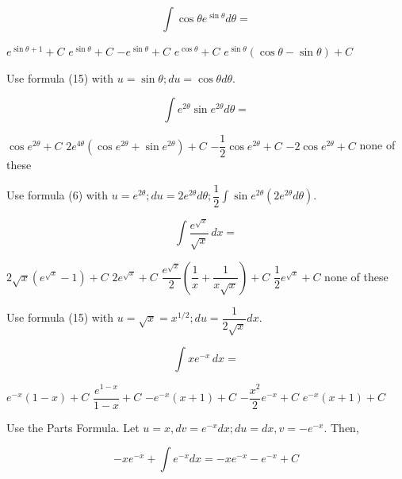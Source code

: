 \newpage


\question
\[
\displaystyle\int \cos \theta e^{\sin \theta} d \theta=
\]
\begin{choices}
  \choice $e^{\sin \theta+1}+C$
  \CorrectChoice $e^{\sin \theta}+C$
  \choice $-e^{\sin \theta}+C$
  \choice $e^{\cos \theta}+C$
  \choice $e^{\sin \theta}(\cos \theta-\sin \theta)+C$
\end{choices}
\begin{solution}
Use formula (15) with $u=\sin \theta ; d u=\cos \theta d \theta$.
\end{solution}

\question
\[
\displaystyle\int e^{2 \theta} \sin e^{2 \theta} d \theta=
\]
\begin{choices}
  \choice $\cos e^{2 \theta}+C$
  \choice $2 e^{4 \theta}\left(\cos e^{2 \theta}+\sin e^{2 \theta}\right)+C$
  \CorrectChoice $-\dfrac{1}{2} \cos e^{2 \theta}+C$
  \choice $-2 \cos e^{2 \theta}+C$
  \choice none of these
\end{choices}
\begin{solution}
Use formula (6) with $u=e^{2 \theta} ; d u=2 e^{2 \theta} d \theta ; \dfrac{1}{2} \displaystyle\int \sin e^{2 \theta}\left(2 e^{2 \theta} d \theta\right)$.
\end{solution}

\question
\[
\displaystyle\int \dfrac{e^{\sqrt{x}}}{\sqrt{x}} \,dx=
\]
\begin{choices}
  \choice $2 \sqrt{x}\left(e^{\sqrt{x}}-1\right)+C$
  \CorrectChoice $2 e^{\sqrt{x}}+C$
  \choice $\dfrac{e^{\sqrt{x}}}{2}\left(\dfrac{1}{x}+\dfrac{1}{x \sqrt{x}}\right)+C$
  \choice $\dfrac{1}{2} e^{\sqrt{x}}+C$
  \choice none of these
\end{choices}
\begin{solution}
Use formula (15) with $u=\sqrt{x}=x^{1 / 2} ; d u=\dfrac{1}{2 \sqrt{x}} d x$.
\end{solution}



\newpage


\question
\[
\displaystyle\int x e^{-x} \,dx=
\]
\begin{choices}
  \choice $e^{-x}(1-x)+C$
  \choice $\dfrac{e^{1-x}}{1-x}+C$
  \CorrectChoice $-e^{-x}(x+1)+C$
  \choice $-\dfrac{x^{2}}{2} e^{-x}+C$
  \choice $e^{-x}(x+1)+C$
\end{choices}
\begin{solution}
Use the Parts Formula. Let $u=x, d v=e^{-x} d x ; d u=d x, v=-e^{-x}$. Then,


\[
-x e^{-x}+\displaystyle\int e^{-x} d x=-x e^{-x}-e^{-x}+C
\]
\end{solution}

